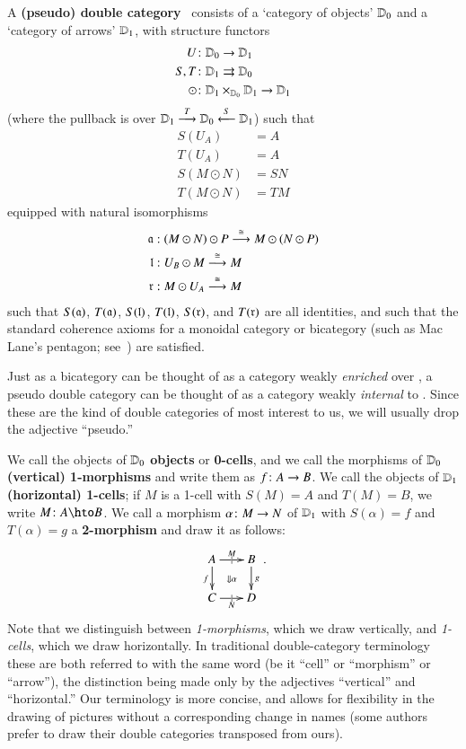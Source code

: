 \documentclass{amsart}
\begin{document}
\begin{defn}
  A \textbf{(pseudo) double category} \lD\ consists of a `category of
  objects' $\lD_0$ and a `category of arrows' $\lD_1$, with structure
  functors
  \begin{align*}
    U&\maps \lD_0\to \lD_1\\
    S,T&\maps \lD_1\rightrightarrows \lD_0\\
    \odot&\maps \lD_1\times_{\lD_0}\lD_1\to \lD_1
  \end{align*}
  (where the pullback is over
  $\lD_1\too[T]\lD_0\overset{S}{\longleftarrow} \lD_1$) such that
  \begin{align*}
    S(U_A) &= A\\
    T(U_A) &= A\\
    S(M\odot N) &= SN\\
    T(M\odot N) &= TM
  \end{align*}
  equipped with natural isomorphisms
  \begin{align*}
    \fa &: (M\odot N) \odot P \too[\iso] M \odot (N \odot P)\\
    \fl &: U_B \odot M \too[\iso] M\\
    \fr &: M \odot U_A \too[\iso] M
  \end{align*}
  such that $S(\fa)$, $T(\fa)$, $S(\fl)$, $T(\fl)$, $S(\fr)$, and
  $T(\fr)$ are all identities, and such that the standard coherence
  axioms for a monoidal category or bicategory (such as Mac Lane's
  pentagon; see~\cite{maclane}) are satisfied.
\end{defn}

Just as a bicategory can be thought of as a category weakly
\emph{enriched} over \cCat, a pseudo double category can be thought of
as a category weakly \emph{internal} to \cCat.  Since these are the
kind of double categories of most interest to us, we will usually drop
the adjective ``pseudo.''

We call the objects of $\lD_0$ \textbf{objects} or \textbf{0-cells},
and we call the morphisms of $\lD_0$ \textbf{(vertical) 1-morphisms}
and write them as $f\maps A\to B$.  We call the objects of $\lD_1$
\textbf{(horizontal) 1-cells}; if $M$ is a 1-cell with $S(M)=A$ and
$T(M)=B$, we write $M\maps A\hto B$.  We call a morphism $\alpha\maps
M\to N$ of $\lD_1$ with $S(\alpha)=f$ and $T(\alpha)=g$ a
\textbf{2-morphism} and draw it as follows:
\begin{equation}\label{eq:square}
  \xymatrix@-.5pc{
    A \ar[r]|{|}^{M}  \ar[d]_f \ar@{}[dr]|{\Downarrow\alpha}&
    B\ar[d]^g\\
    C \ar[r]|{|}_N & D
  }.
\end{equation}
Note that we distinguish between \emph{1-morphisms}, which we draw
vertically, and \emph{1-cells}, which we draw horizontally.  In
traditional double-category terminology these are both referred to
with the same word (be it ``cell'' or ``morphism'' or ``arrow''), the
distinction being made only by the adjectives ``vertical'' and
``horizontal.''  Our terminology is more concise, and allows for
flexibility in the drawing of pictures without a corresponding change
in names (some authors prefer to draw their double categories
transposed from ours).
\end{document}
